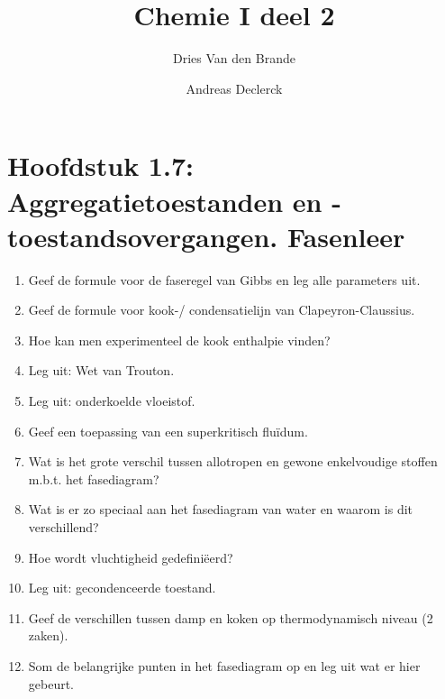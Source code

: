 \documentclass[12pt]{article}
\begin{document}
    \title{Chemie I deel 2}
    \author{Dries Van den Brande \and Andreas Declerck}

    \maketitle
    \section*{Hoofdstuk 1.7: Aggregatietoestanden en -toestandsovergangen. Fasenleer}
    \begin{enumerate}
        \item Geef de formule voor de faseregel van Gibbs en leg alle parameters uit.
        \item Geef de formule voor kook-/ condensatielijn van Clapeyron-Claussius.
        \item Hoe kan men experimenteel de kook enthalpie vinden?
        \item Leg uit: Wet van Trouton.
        \item Leg uit: onderkoelde vloeistof.
        \item Geef een toepassing van een superkritisch flu\"idum.
        \item Wat is het grote verschil tussen allotropen en gewone enkelvoudige stoffen m.b.t. het fasediagram?
        \item Wat is er zo speciaal aan het fasediagram van water en waarom is dit verschillend?
        \item Hoe wordt vluchtigheid gedefini\"eerd?
        \item Leg uit: gecondenceerde toestand.
        \item Geef de verschillen tussen damp en koken op thermodynamisch niveau (2 zaken).
        \item Som de belangrijke punten in het fasediagram op en leg uit wat er hier gebeurt.
    \end{enumerate}
\end{document}
